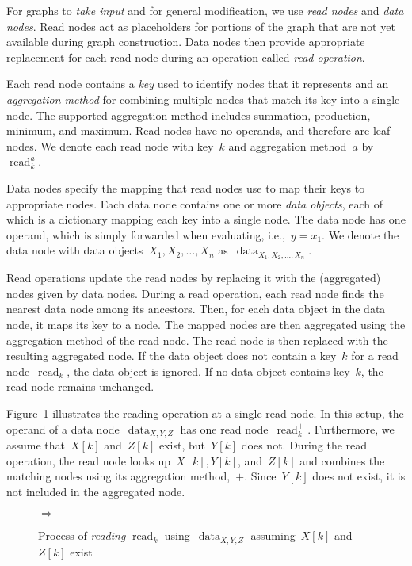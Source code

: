 \documentclass{article}
\DeclareMathOperator{\readNode}{read}
\DeclareMathOperator{\dataNode}{data}
\begin{document}
For graphs to \emph{take input} and for general modification, we use \emph{read nodes} and \emph{data nodes}.
Read nodes act as placeholders for portions of the graph that are not yet available during graph construction.
Data nodes then provide appropriate replacement for each read node during an operation called \emph{read operation}.

Each read node contains a \emph{key} used to identify nodes that it represents and an \emph{aggregation method} for combining multiple nodes that match its key into a single node.
The supported aggregation method includes summation, production, minimum, and maximum.
Read nodes have no operands, and therefore are leaf nodes.
We denote each read node with key~$k$ and aggregation method~$a$ by~$\readNode_k^a$.

Data nodes specify the mapping that read nodes use to map their keys to appropriate nodes.
Each data node contains one or more \emph{data objects}, each of which is a dictionary mapping each key into a single node.
The data node has one operand, which is simply forwarded when evaluating, i.e.,~$y = x_1$.
We denote the data node with data objects~$X_1, X_2, \dots, X_n$ as~$\dataNode_{X_1, X_2,\dots, X_n}$.

Read operations update the read nodes by replacing it with the (aggregated) nodes given by data nodes.
During a read operation, each read node finds the nearest data node among its ancestors.
Then, for each data object in the data node, it maps its key to a node.
The mapped nodes are then aggregated using the aggregation method of the read node.
The read node is then replaced with the resulting aggregated node.
If the data object does not contain a key~$k$ for a read node~$\readNode_k$, the data object is ignored.
If no data object contains key~$k$, the read node remains unchanged.

Figure~\ref{fig:modification:reading} illustrates the reading operation at a single read node.
In this setup, the operand of a data node~$\dataNode_{X,Y,Z}$ has one read node~$\readNode_k^+$.
Furthermore, we assume that~$X[k]$ and~$Z[k]$ exist, but~$Y[k]$ does not.
During the read operation, the read node looks up~$X[k], Y[k]$, and~$Z[k]$ and combines the matching nodes using its aggregation method,~$+$.
Since~$Y[k]$ does not exist, it is not included in the aggregated node.
%
\begin{figure}
	\centering
	\quad$\Rightarrow$\quad
	\caption{Process of \emph{reading} $\readNode_k$ using~$\dataNode_{X, Y, Z}$ assuming~$X[k]$ and~$Z[k]$ exist}
	\label{fig:modification:reading}
\end{figure}
\end{document}
